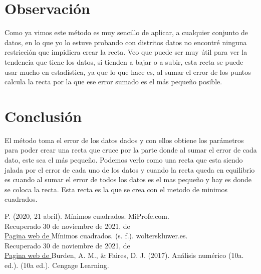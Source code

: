 \documentclass[12pt]{article}
\begin{document}
		\section*{\centering Observación}\label{sec:Observacion}
			Como ya vimos este método es muy sencillo de aplicar, a cualquier conjunto de datos, en lo que yo lo 
			estuve probando con distritos datos no encontré ninguna restricción que impidiera crear la recta. Veo 
			que puede ser muy útil para ver la tendencia que tiene los datos, si tienden a bajar o a subir, esta 
			recta se puede usar mucho en estadística, ya que lo que hace es, al sumar el error de los puntos calcula 
			la recta por la que ese error sumado es el más pequeño posible.
		\section*{\centering Conclusión}\label{sec:Conclusion}
			El método toma el error de los datos dados y con ellos obtiene los parámetros para poder crear una recta 
			que cruce por la parte donde al sumar el error de cada dato, este sea el más pequeño. Podemos verlo como 
			una recta que esta siendo jalada por el error de cada uno de los datos y cuando la recta queda 
			en equilibrio es cuando al sumar el error de todos los datos es el mas pequeño y hay es donde se coloca la 
			recta. Esta recta es la que se crea con el metodo de minimos cuadrados.

		\centering
		\begin{thebibliography}{10}
			 P. (2020, 21 abril). Mínimos cuadrados. MiProfe.com.\\ 
							Recuperado 30 de noviembre de 2021, de \\
							\href{https://miprofe.com/minimos-cuadrados/}{Pagina web de \cite{bib:item1}}
			 Mínimos cuadrados. (s. f.). wolterskluwer.es. \\ 
							Recuperado 30 de noviembre de 2021, de \\
							\href{https://guiasjuridicas.wolterskluwer.es/Content/Documento.aspx?params=H4sIAAAAAAAEAMtMSbF1jTAAASMTc0MTtbLUouLM_DxbIwMDS0NDQ3OQQGZapUt-ckhlQaptWmJOcSoANxx0UzUAAAA=WKE}{Pagina web de \cite{bib:item2}}
			 Burden, A. M., \& Faires, D. J. (2017). Análisis numérico (10a. ed.). (10a ed.). Cengage Learning.
		\end{thebibliography}

	
\end{document}
